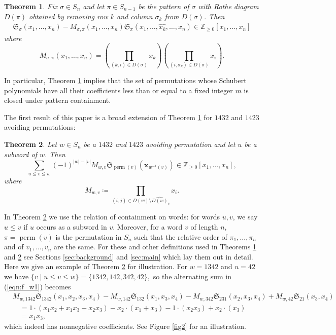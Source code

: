 \documentclass{amsart}
\newtheorem{theorem}{Theorem}[section]
\theoremstyle{definition}
\theoremstyle{named}
\def\Z{\mathbb{Z}}
\newcommand*{\Schub}{\mathfrak{S}}
\DeclareMathOperator*{\perm}{perm}
\begin{document}
		\begin{theorem} \cite[Theorem 1.2]{zeroone}  \label{thm:fms} 		Fix  $\sigma \in S_n$ and let $\pi \in S_{n-1}$ be the pattern of $\sigma$ with Rothe diagram $D(\pi)$ obtained by removing row $k$  and column $\sigma_k$ from $D(\sigma)$. Then
		\begin{align} \label{eq:?}
			\mathfrak{S}_{\sigma}(x_1, \ldots, x_n)-M_{\sigma, \pi}(x_1, \ldots, x_n) \mathfrak{S}_{\pi}(x_{1}, \ldots, \widehat{x_k}, \ldots, x_{n}) \in \mathbb{Z}_{\geq 0}[x_1, \ldots, x_n]		\end{align}  
		where   
		\[M_{\sigma, \pi}(x_1, \ldots, x_n) = \left(\prod_{(k,i)\in D(\sigma)}{x_k}\right)\left(\prod_{(i,\sigma_k)\in D(\sigma)}{x_i} \right).\]
		\end{theorem}

		In particular, Theorem \ref{thm:fms} implies that the set of permutations whose Schubert polynomials have all their coefficients less than or equal to a fixed integer $m$ is closed under pattern containment.

\medskip

		The first result of this paper is a broad extension of Theorem \ref{thm:fms} for $1432$ and $1423$ avoiding permutations:   

\begin{theorem} \label{thm:main}
Let $w \in S_n$ be a $1432$ and $1423$ avoiding permutation and let $u$ be a subword of $w$. Then
\begin{equation} \label{eqn:f_w1}
\sum_{u \le v \le w} (-1)^{\left|w\right|-\left|v\right|} M_{w, v} \Schub_{\perm(v)}(\mathbf{x}_{w^{-1}(v)}) \in \Z_{\ge0}[x_1, \dots, x_n],
\end{equation}
where
\begin{equation*}
M_{w, v} \coloneqq \prod_{(i, j) \in D(w) \setminus \widehat{D(w)}_v} x_i.
\end{equation*}
\end{theorem}

In Theorem \ref{thm:main} we use the relation of containment on words: for words $u, v$, we say $u \le v$ if $u$ occurs as a subword in $v$. Moreover, for a word $v$ of length $n$, $\pi = \perm(v)$ is the permutation in $S_n$ such that the relative order of $\pi_1, \dots, \pi_n$ and of $v_1, \dots, v_n$ are the same.
For these and  other definitions used in Theorems \ref{thm:fms} and \ref{thm:main} see   Sections \ref{sec:background} and \ref{sec:main} which lay them out in detail. Here we give an example of Theorem \ref{thm:main} for illustration.
For $w = 1342$ and $u = 42$ we have
$\{ v \mid u \le v \le w \} = \{ 1342, 142, 342, 42 \},$
so the alternating sum in (\ref{eqn:f_w1}) becomes
\begin{align*}
&M_{w, 1342}\Schub_{1342}(x_1,x_2, x_3, x_4) - M_{w, 142}\Schub_{132}(x_1, x_3, x_4) - M_{w, 342}\Schub_{231}(x_2, x_3, x_4) + M_{w, 42}\Schub_{21}(x_3, x_4) \\
&\quad = 1 \cdot (x_1x_2 + x_1x_3 + x_2x_3) - x_2 \cdot (x_1 + x_3) - 1 \cdot (x_2 x_3) + x_2 \cdot (x_3) \\
&\quad = x_1x_3,
\end{align*}
which indeed has nonnegative coefficients. See Figure \ref{fig2} for an illustration.  
\medskip
\end{document}
